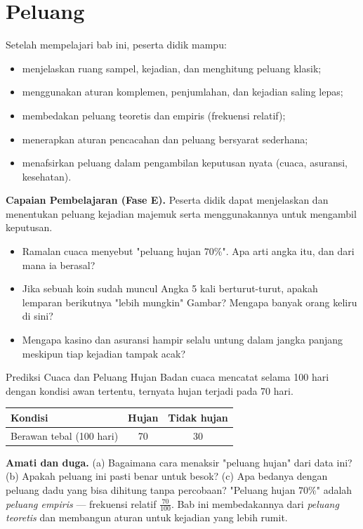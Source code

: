 \documentclass[11pt,a4paper]{report}
\theoremstyle{gaya}
\begin{document}
\chapter{Peluang}
\begin{tujuan}
Setelah mempelajari bab ini, peserta didik mampu:
\begin{itemize}[leftmargin=*,topsep=2pt]
  \item menjelaskan ruang sampel, kejadian, dan menghitung peluang klasik;
  \item menggunakan aturan komplemen, penjumlahan, dan kejadian saling lepas;
  \item membedakan peluang teoretis dan empiris (frekuensi relatif);
  \item menerapkan aturan pencacahan dan peluang bersyarat sederhana;
  \item menafsirkan peluang dalam pengambilan keputusan nyata (cuaca, asuransi, kesehatan).
\end{itemize}
\textbf{Capaian Pembelajaran (Fase E).} Peserta didik dapat menjelaskan dan menentukan peluang kejadian majemuk serta menggunakannya untuk mengambil keputusan.
\end{tujuan}

\begin{pemantik}
\begin{itemize}[leftmargin=*,topsep=2pt]
  \item Ramalan cuaca menyebut "peluang hujan $70\%$". Apa arti angka itu, dan dari mana ia berasal?
  \item Jika sebuah koin sudah muncul Angka 5 kali berturut-turut, apakah lemparan berikutnya "lebih mungkin" Gambar? Mengapa banyak orang keliru di sini?
  \item Mengapa kasino dan asuransi hampir selalu untung dalam jangka panjang meskipun tiap kejadian tampak acak?
\end{itemize}
\end{pemantik}

\begin{studikasus}{Prediksi Cuaca dan Peluang Hujan}
Badan cuaca mencatat selama 100 hari dengan kondisi awan tertentu, ternyata hujan terjadi pada 70 hari.
\begin{center}
\begin{tabular}{l|c|c}
\toprule
Kondisi & Hujan & Tidak hujan \\
\midrule
Berawan tebal (100 hari) & 70 & 30 \\
\bottomrule
\end{tabular}
\end{center}
\textbf{Amati dan duga.} (a) Bagaimana cara menaksir "peluang hujan" dari data ini? (b) Apakah peluang ini pasti benar untuk besok? (c) Apa bedanya dengan peluang dadu yang bisa dihitung tanpa percobaan? "Peluang hujan $70\%$" adalah \emph{peluang empiris} --- frekuensi relatif $\tfrac{70}{100}$. Bab ini membedakannya dari \emph{peluang teoretis} dan membangun aturan untuk kejadian yang lebih rumit.
\end{studikasus}
\end{document}
